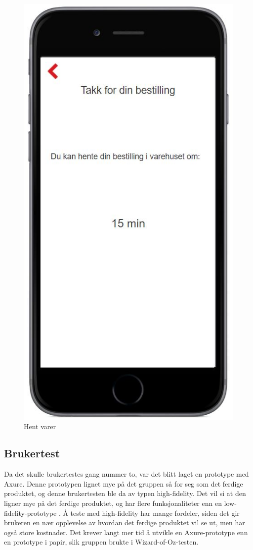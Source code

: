\begin{figure}[H]
\includegraphics[scale=0.55]{images/axurebilder/hent_varer}
\centering %
\caption{Hent varer}
\label{fig:hent_varer}
\end{figure}


\subsection{Brukertest}
Da det skulle brukertestes gang nummer to, var det blitt laget en prototype med Axure. Denne prototypen lignet mye på det gruppen så for seg som det ferdige produktet, og denne brukertesten ble da av typen high-fidelity. Det vil si at den ligner mye på det ferdige produktet, og har flere funksjonaliteter enn en low-fidelity-prototype \cite[s.~391]{preece}. Å teste med high-fidelity har mange fordeler, siden det gir brukeren en nær opplevelse av hvordan det ferdige produktet vil se ut, men har også store kostnader. Det krever langt mer tid å utvikle en Axure-prototype enn en prototype i papir, slik gruppen brukte i Wizard-of-Oz-testen.

